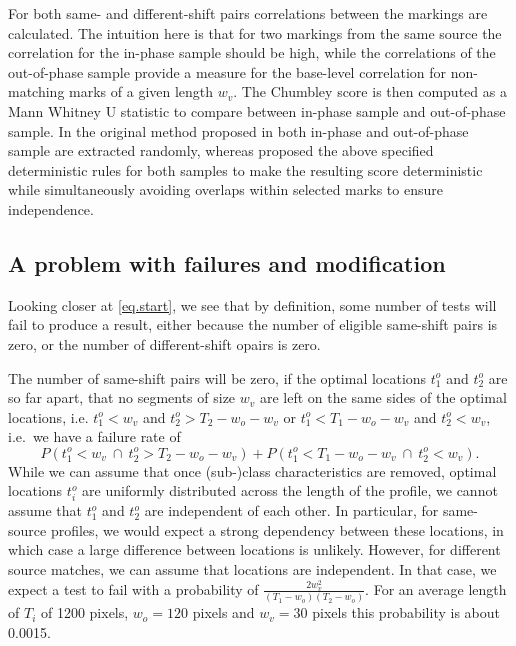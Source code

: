 \documentclass[12pt]{article}
\begin{document}
For both same- and different-shift pairs correlations between the
markings are calculated. The intuition here is that for two markings
from the same source the correlation for the in-phase sample should be
high, while the correlations of the out-of-phase sample provide a
measure for the base-level correlation for non-matching marks of a given
length \(w_v\). The Chumbley score is then computed as a Mann Whitney U
statistic to compare between in-phase sample and out-of-phase sample. In
the original method proposed in \citet{chumbley} both in-phase and
out-of-phase sample are extracted randomly, whereas \citet{hadler}
proposed the above specified deterministic rules for both samples to
make the resulting score deterministic while simultaneously avoiding
overlaps within selected marks to ensure independence.

\subsection{A problem with failures and
modification}\label{a-problem-with-failures-and-modification}

Looking closer at \autoref{eq.start}, we see that by definition, some
number of tests will fail to produce a result, either because the number
of eligible same-shift pairs is zero, or the number of different-shift
opairs is zero.

The number of same-shift pairs will be zero, if the optimal locations
\(t_1^{o}\) and \(t_2^{o}\) are so far apart, that no segments of size
\(w_v\) are left on the same sides of the optimal locations, i.e.
\(t_1^{o} < w_v\) and \(t_2^{o} > T_2-w_o-w_v\) or
\(t_1^{o} < T_1- w_o - w_v\) and \(t_2^{o} < w_v\), i.e.~we have a
failure rate of \[
P\left( t_1^{o} < w_v \ \cap \ t_2^{o} > T_2-w_o-w_v\right) + P\left( t_1^{o} < T_1- w_o - w_v \ \cap \ t_2^{o} < w_v\right).
\] While we can assume that once (sub-)class characteristics are
removed, optimal locations \(t_i^{o}\) are uniformly distributed across
the length of the profile, we cannot assume that \(t_1^o\) and \(t_2^o\)
are independent of each other. In particular, for same-source profiles,
we would expect a strong dependency between these locations, in which
case a large difference between locations is unlikely. However, for
different source matches, we can assume that locations are independent.
In that case, we expect a test to fail with a probability of
\(\frac{2 w_v^2}{(T_1-w_o)(T_2-w_o)}\). For an average length of \(T_i\)
of 1200 pixels, \(w_o = 120\) pixels and \(w_v = 30\) pixels this
probability is about 0.0015.
\end{document}
